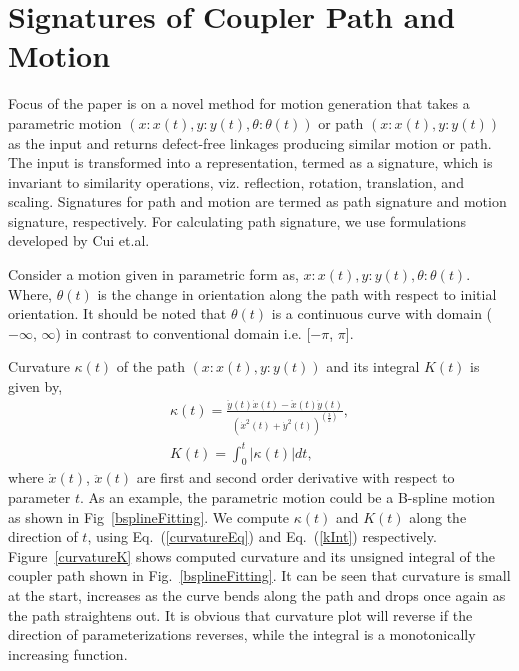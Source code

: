 \documentclass[twocolumn,10pt]{asme2e}
\newcommand{\req}[1]{(\ref{#1})}
\begin{document}
\section{Signatures of Coupler Path and Motion}\label{sec_sign}
Focus of the paper is on a novel method for motion generation that takes a parametric motion $(x:x(t), y:y(t), \theta:\theta(t))$ or path $(x:x(t), y:y(t))$ as the input and returns defect-free linkages producing similar motion or path.
The input is transformed into a representation, termed as a signature, which is invariant to similarity operations, viz. reflection, rotation, translation, and scaling.
Signatures for path and motion are termed as path signature and motion signature, respectively.
For calculating path signature, we use formulations developed by Cui et.al\cite{cui2009}.

Consider a motion given in parametric form as, $x:x(t), y:y(t), \theta:\theta(t)$.
Where, $\theta(t)$ is the change in orientation along the path with respect to initial orientation.
It should be noted that $\theta(t)$ is a continuous curve with domain ($-\infty$, $\infty$) in contrast to conventional domain i.e. [$-\pi$, $\pi$].

Curvature $\kappa(t)$ of the path $(x:x(t), y:y(t))$ and its integral $K(t)$ is given by,
\begin{eqnarray}
  \kappa(t) = \frac{\ddot{y}(t)\dot{x}(t) - \ddot{x}(t)\dot{y}(t)}{{(\dot{x}^2(t) + \dot{y}^2(t))}^{(\frac 32)}}, \label{curvatureEq}\\
  K(t) = \int^{t}_0 |\kappa(t)|dt \label{kInt},
\end{eqnarray}
where $\dot{x}(t)$, $\ddot{x}(t)$ are first and second order derivative with respect to parameter $t$.
As an example, the parametric motion could be a B-spline motion as shown in Fig~\ref{bsplineFitting}.
We compute $\kappa(t)$ and $K(t)$ along the direction of $t$, using Eq.~\req{curvatureEq} and Eq.~\req{kInt} respectively.
Figure~\ref{curvatureK} shows computed curvature and its unsigned integral of the coupler path shown in Fig.~\ref{bsplineFitting}.
It can be seen that curvature is small at the start, increases as the curve bends along the path and drops once again as the path straightens out. It is obvious that curvature plot will reverse if the direction of parameterizations reverses, while the integral is a monotonically increasing function.
\end{document}
